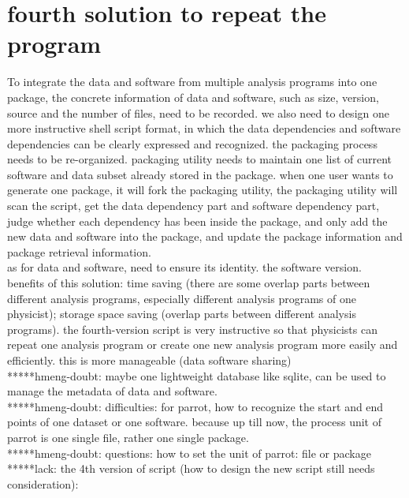 \documentclass{article}
\begin{document}
\section{fourth solution to repeat the program}
\indent To integrate the data and software from multiple analysis programs into one package, the concrete information of data and software, such as size, version, source and the number of files, need to be recorded. we also need to design one more instructive shell script format, in which the data dependencies and software dependencies can be clearly expressed and recognized. the packaging process needs to be re-organized. packaging utility needs to maintain one list of current software and data subset already stored in the package. when one user wants to generate one package, it will fork the packaging utility, the packaging utility will scan the script, get the data dependency part and software dependency part, judge whether each dependency has been inside the package, and only add the new data and software into the package, and update the package information and package retrieval information.\\

as for data and software, need to ensure its identity. the software version.\\

benefits of this solution: time saving (there are some overlap parts between different analysis programs, especially different analysis programs of one physicist); storage space saving (overlap parts between different analysis programs). the fourth-version script is very instructive so that physicists can repeat one analysis program or create one new analysis program more easily and efficiently.  this is more manageable (data software sharing)\\

*****hmeng-doubt: maybe one lightweight database like sqlite, can be used to manage the metadata of data and software. \\

*****hmeng-doubt: difficulties: for parrot, how to recognize the start and end points of one dataset or one software. because up till now, the process unit of parrot is one single file, rather one single package.\\

*****hmeng-doubt: questions: how to set the unit of parrot: file or package\\

*****lack: the 4th version of script (how to design the new script still needs consideration):\\
\end{document}
